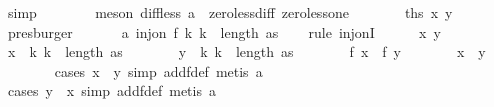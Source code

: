 \begin{isabellebody}
\ simp\isanewline
\ \ \ \ \ \ \isamarkupfalse%
\ {\isacharparenleft}{\kern0pt}meson\ diff{\isacharunderscore}{\kern0pt}less\ a{}{\isacharunderscore}{\kern0pt}{}\ \ zero{\isacharunderscore}{\kern0pt}less{\isacharunderscore}{\kern0pt}diff\ zero{\isacharunderscore}{\kern0pt}less{\isacharunderscore}{\kern0pt}one{\isacharparenright}{\kern0pt}\isanewline
\ \ \ \ \isamarkupfalse%
\ \isamarkupfalse%
\ {\isachardoublequoteopen}{\isacharquery}{\kern0pt}ths\ x\ y{\isachardoublequoteclose}\ \isamarkupfalse%
\ presburger\isanewline
\ \ \isamarkupfalse%
\isanewline
\isanewline
\ \ \isamarkupfalse%
\ a{}{\isacharcolon}{\kern0pt}\ {\isachardoublequoteopen}inj{\isacharunderscore}{\kern0pt}on\ f\ {\isacharbraceleft}{\kern0pt}k{\isachardot}{\kern0pt}\ k\ {\isacharless}{\kern0pt}\ length\ as{\isacharbraceright}{\kern0pt}{\isachardoublequoteclose}\isanewline
\ \ \isamarkupfalse%
\ {\isacharparenleft}{\kern0pt}rule\ inj{\isacharunderscore}{\kern0pt}onI{\isacharparenright}{\kern0pt}\isanewline
\ \ \ \ \isamarkupfalse%
\ x\ y\isanewline
\ \ \ \ \isamarkupfalse%
\ {\isachardoublequoteopen}x\ {\isasymin}\ {\isacharbraceleft}{\kern0pt}k{\isachardot}{\kern0pt}\ k\ {\isacharless}{\kern0pt}\ length\ as{\isacharbraceright}{\kern0pt}{\isachardoublequoteclose}\isanewline
\ \ \ \ \isamarkupfalse%
\ \isamarkupfalse%
\ {\isachardoublequoteopen}y\ {\isasymin}\ {\isacharbraceleft}{\kern0pt}k{\isachardot}{\kern0pt}\ k\ {\isacharless}{\kern0pt}\ length\ as{\isacharbraceright}{\kern0pt}{\isachardoublequoteclose}\isanewline
\ \ \ \ \isamarkupfalse%
\ \isamarkupfalse%
\ {\isachardoublequoteopen}f\ x\ {\isacharequal}{\kern0pt}\ f\ y{\isachardoublequoteclose}\isanewline
\ \ \ \ \isamarkupfalse%
\ \isamarkupfalse%
\ {\isachardoublequoteopen}x\ {\isacharequal}{\kern0pt}\ y{\isachardoublequoteclose}\isanewline
\ \ \ \ \ \ \isamarkupfalse%
\ {\isacharparenleft}{\kern0pt}cases\ {\isachardoublequoteopen}x\ {\isacharless}{\kern0pt}\ y{\isachardoublequoteclose}{\isacharcomma}{\kern0pt}\ simp\ add{\isacharcolon}{\kern0pt}f{\isacharunderscore}{\kern0pt}def{\isacharcomma}{\kern0pt}\ metis\ a{}{\isacharparenright}{\kern0pt}\ \isanewline
\ \ \ \ \ \ \isamarkupfalse%
\ {\isacharparenleft}{\kern0pt}cases\ {\isachardoublequoteopen}y\ {\isacharless}{\kern0pt}\ x{\isachardoublequoteclose}{\isacharcomma}{\kern0pt}\ simp\ add{\isacharcolon}{\kern0pt}f{\isacharunderscore}{\kern0pt}def{\isacharcomma}{\kern0pt}\ metis\ a{}{\isacharparenright}{\kern0pt}\ \isanewline

\end{isabellebody}
